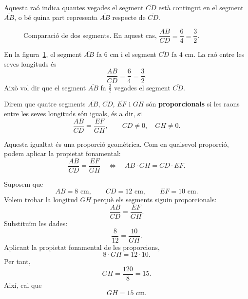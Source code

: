 Aquesta raó indica quantes vegades el segment \(\overline{CD}\) està contingut en el segment \(\overline{AB}\), o bé quina part representa \(\overline{AB}\) respecte de \(\overline{CD}\).

\begin{figure}[htbp]
\centering
{}
\caption{Comparació de dos segments. En aquest cas, \(\dfrac{AB}{CD}=\dfrac{6}{4}=\dfrac{3}{2}\).}
\label{fig:comparacio-segments}
\end{figure}

\begin{exemple}
En la figura~\ref{fig:comparacio-segments}, el segment \(\overline{AB}\) fa \(6\) cm i el segment \(\overline{CD}\) fa \(4\) cm. La raó entre les seves longituds és
\[
	\frac{AB}{CD}
	=
	\frac{6}{4}
	=
	\frac{3}{2}.
\]
Això vol dir que el segment \(\overline{AB}\) fa \(\frac{3}{2}\) vegades el segment \(\overline{CD}\).
\end{exemple}

\begin{definicio}
Direm que quatre segments \(\overline{AB}\), \(\overline{CD}\), \(\overline{EF}\) i \(\overline{GH}\) són \textbf{proporcionals} si les raons entre les seves longituds són iguals, és a dir, si
\[
	\frac{AB}{CD}
	=
	\frac{EF}{GH},
	\qquad CD\neq 0,\quad GH\neq 0.
\]
\end{definicio}

Aquesta igualtat és una proporció geomètrica. Com en qualsevol proporció, podem aplicar la propietat fonamental:
\[
	\frac{AB}{CD}
	=
	\frac{EF}{GH}
	\quad\Longleftrightarrow\quad
	AB\cdot GH=CD\cdot EF.
\]

\begin{exemple}
Suposem que
\[
	AB=8\text{ cm},\qquad CD=12\text{ cm},\qquad EF=10\text{ cm}.
\]
Volem trobar la longitud \(GH\) perquè els segments siguin proporcionals:
\[
	\frac{AB}{CD}
	=
	\frac{EF}{GH}.
\]
Substituïm les dades:
\[
	\frac{8}{12}
	=
	\frac{10}{GH}.
\]
Aplicant la propietat fonamental de les proporcions,
\[
	8\cdot GH=12\cdot 10.
\]
Per tant,
\[
	GH=\frac{120}{8}=15.
\]
Així, cal que
\[
	GH=15\text{ cm}.
\]
\end{exemple}

